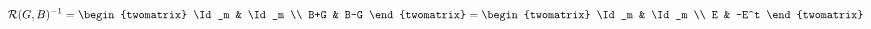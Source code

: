 \begin{equation}
\label{eq:Rinv}
  \mathcal{R}(G,B)^{-1} = \begin{twomatrix}
                            \Id_m & \Id_m \\
                             B+G  &  B-G
                          \end{twomatrix}
  = \begin{twomatrix}
      \Id_m & \Id_m \\
         E  &  -E^t
    \end{twomatrix}
\end{equation}


